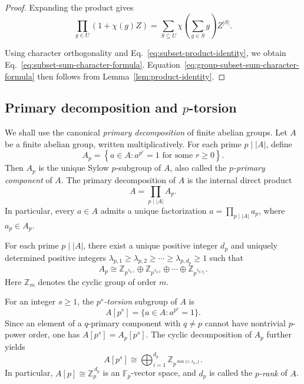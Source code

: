 \documentclass[11pt]{article}
\theoremstyle{definition}
\begin{document}
\begin{proof}
	
	Expanding the product gives
	\begin{equation}\label{eq:subset-product-identity}
		\prod_{g\in U}(1+\chi(g)Z)
		=\sum_{S\subseteq U}\chi\left(\sum_{g\in S}g\right)Z^{|S|}.
	\end{equation}
	
	Using character orthogonality and Eq.~\eqref{eq:subset-product-identity}, we obtain Eq.~\eqref{eq:subset-sum-character-formula}. Equation~\eqref{eq:group-subset-sum-character-formula} then follows from Lemma~\ref{lem:product-identity}.
\end{proof}

\subsection{Primary decomposition and \texorpdfstring{$p$}{p}-torsion}

We shall use the canonical \emph{primary decomposition} of finite
abelian groups. Let $A$ be a finite abelian group, written
multiplicatively. For each prime $p\mid |A|$, define
\[
A_p
=
\left\{
a\in A:
a^{p^r}=1
\text{ for some } r\ge 0
\right\}.
\]
Then $A_p$ is the unique Sylow $p$-subgroup of $A$, also called the
\emph{$p$-primary component} of $A$. The primary decomposition of
$A$ is the internal direct product
\[
A=\prod_{p\mid |A|} A_p.
\]
In particular, every $a\in A$ admits a unique factorization $a=\prod_{p\mid |A|}a_p$, where $a_p\in A_p$.


For each prime $p\mid |A|$, there exist a unique positive integer $d_p$ and uniquely determined positive integers
$\lambda_{p,1}\ge\lambda_{p,2}\ge\cdots\ge\lambda_{p,d_p}\ge1$ such that
\[
A_p
\cong
\mathbb Z_{p^{\lambda_{p,1}}}
\oplus \mathbb Z_{p^{\lambda_{p,2}}}
\oplus\cdots\oplus
\mathbb Z_{p^{\lambda_{p,d_p}}}.
\]
Here $\mathbb Z_m$ denotes the cyclic group of order $m$.


For an integer $s\ge1$, the \emph{$p^s$-torsion} subgroup of $A$ is
\[
A[p^s]=\{a\in A:a^{p^s}=1\}.
\]
Since an element of a $q$-primary component with $q\ne p$ cannot have nontrivial $p$-power order, one has $A[p^s]=A_p[p^s]$. The cyclic decomposition of $A_p$ further yields
\[
A[p^s]
\cong
\bigoplus_{i=1}^{d_p}
\mathbb Z_{p^{\min\{s,\lambda_{p,i}\}}}.
\]
In particular, $A[p]\cong \mathbb Z_p^{\,d_p}$ is an $\mathbb F_p$-vector space, and $d_p$ is called the \emph{$p$-rank} of $A$.
\end{document}
